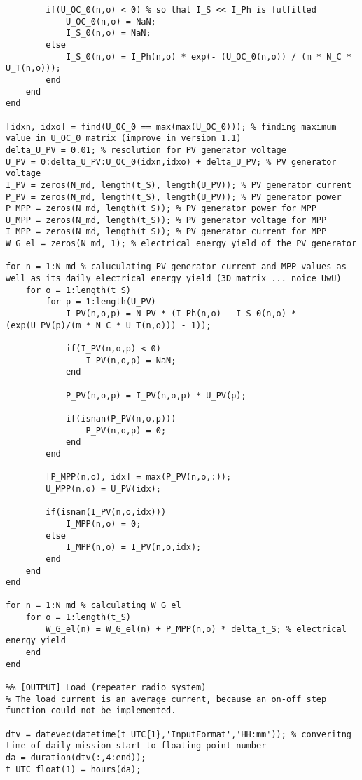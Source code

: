 \begin{lstlisting}
        if(U_OC_0(n,o) < 0) % so that I_S << I_Ph is fulfilled
            U_OC_0(n,o) = NaN;
            I_S_0(n,o) = NaN;
        else
            I_S_0(n,o) = I_Ph(n,o) * exp(- (U_OC_0(n,o)) / (m * N_C * U_T(n,o)));
        end
    end
end

[idxn, idxo] = find(U_OC_0 == max(max(U_OC_0))); % finding maximum value in U_OC_0 matrix (improve in version 1.1)
delta_U_PV = 0.01; % resolution for PV generator voltage
U_PV = 0:delta_U_PV:U_OC_0(idxn,idxo) + delta_U_PV; % PV generator voltage
I_PV = zeros(N_md, length(t_S), length(U_PV)); % PV generator current
P_PV = zeros(N_md, length(t_S), length(U_PV)); % PV generator power
P_MPP = zeros(N_md, length(t_S)); % PV generator power for MPP
U_MPP = zeros(N_md, length(t_S)); % PV generator voltage for MPP
I_MPP = zeros(N_md, length(t_S)); % PV generator current for MPP
W_G_el = zeros(N_md, 1); % electrical energy yield of the PV generator

for n = 1:N_md % caluculating PV generator current and MPP values as well as its daily electrical energy yield (3D matrix ... noice UwU)
    for o = 1:length(t_S)
        for p = 1:length(U_PV)
            I_PV(n,o,p) = N_PV * (I_Ph(n,o) - I_S_0(n,o) * (exp(U_PV(p)/(m * N_C * U_T(n,o))) - 1));
            
            if(I_PV(n,o,p) < 0)
                I_PV(n,o,p) = NaN;
            end
            
            P_PV(n,o,p) = I_PV(n,o,p) * U_PV(p);
            
            if(isnan(P_PV(n,o,p)))
                P_PV(n,o,p) = 0;
            end
        end
        
        [P_MPP(n,o), idx] = max(P_PV(n,o,:));
        U_MPP(n,o) = U_PV(idx);
        
        if(isnan(I_PV(n,o,idx)))
            I_MPP(n,o) = 0;
        else
            I_MPP(n,o) = I_PV(n,o,idx);
        end
    end
end

for n = 1:N_md % calculating W_G_el
    for o = 1:length(t_S)
        W_G_el(n) = W_G_el(n) + P_MPP(n,o) * delta_t_S; % electrical energy yield
    end
end

%% [OUTPUT] Load (repeater radio system)
% The load current is an average current, because an on-off step function could not be implemented.

dtv = datevec(datetime(t_UTC{1},'InputFormat','HH:mm')); % converitng time of daily mission start to floating point number
da = duration(dtv(:,4:end));
t_UTC_float(1) = hours(da);


\end{lstlisting}
